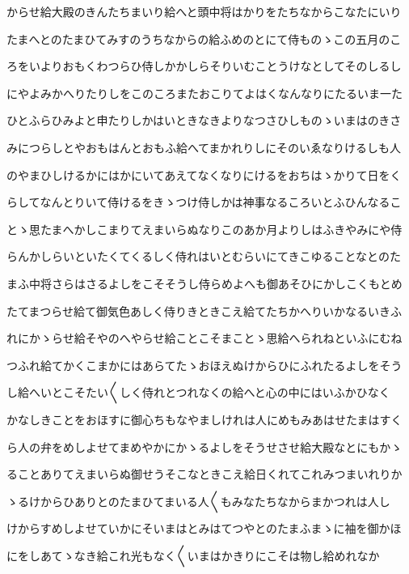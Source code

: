 \documentclass[a4paper,11pt,landscape]{ltjtarticle}
\begin{document}
\par\medskip
からせ給大殿のきんたちまいり給へと頭中将はかりをたちなからこなたにいり
\par\medskip
たまへとのたまひてみすのうちなからの給ふめのとにて侍ものゝこの五月のこ
\par\medskip
ろをいよりおもくわつらひ侍しかかしらそりいむことうけなとしてそのしるし
\par\medskip
にやよみかへりたりしをこのころまたおこりてよはくなんなりにたるいま一た
\par\medskip
ひとふらひみよと申たりしかはいときなきよりなつさひしものゝいまはのきさ
\par\medskip
みにつらしとやおもはんとおもふ給へてまかれりしにそのいゑなりけるしも人
\par\medskip
のやまひしけるかにはかにいてあえてなくなりにけるをおちはゝかりて日をく
\par\medskip
らしてなんとりいて侍けるをきゝつけ侍しかは神事なるころいとふひんなるこ
\par\medskip
とゝ思たまへかしこまりてえまいらぬなりこのあか月よりしはふきやみにや侍
\par\medskip
らんかしらいといたくてくるしく侍れはいとむらいにてきこゆることなとのた
\par\medskip
まふ中将さらはさるよしをこそそうし侍らめよへも御あそひにかしこくもとめ
\par\medskip
たてまつらせ給て御気色あしく侍りきときこえ給てたちかへりいかなるいきふ
\par\medskip
れにかゝらせ給そやのへやらせ給ことこそまことゝ思給へられねといふにむね
\par\medskip
つふれ給てかくこまかにはあらてたゝおほえぬけからひにふれたるよしをそう
\par\medskip
し給へいとこそたい〱しく侍れとつれなくの給へと心の中にはいふかひなく
\par\medskip
かなしきことをおほすに御心ちもなやましけれは人にめもみあはせたまはすく
\par\medskip
ら人の弁をめしよせてまめやかにかゝるよしをそうせさせ給大殿なとにもかゝ
\par\medskip
ることありてえまいらぬ御せうそこなときこえ給日くれてこれみつまいれりか
\par\medskip
ゝるけからひありとのたまひてまいる人〱もみなたちなからまかつれは人し
\par\medskip
けからすめしよせていかにそいまはとみはてつやとのたまふまゝに袖を御かほ
\par\medskip
にをしあてゝなき給これ光もなく〱いまはかきりにこそは物し給めれなか
\par\medskip
\end{document}

